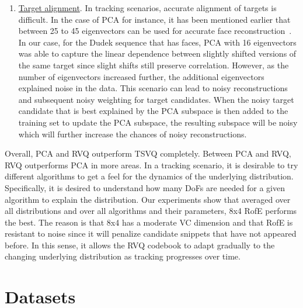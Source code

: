 \begin{enumerate}
\item \underline{Target alignment}.  In tracking scenarios, accurate alignment of targets is difficult.  In the case of PCA for instance, it has been mentioned earlier that between 25 to 45 eigenvectors can be used for accurate face reconstruction~\cite{1997_JNL_EigenVsFisherFaces_Bel}.  In our case, for the Dudek sequence that has faces, PCA with 16 eigenvectors was able to capture the linear dependence between slightly shifted versions of the same target since slight shifts still preserve correlation.  However, as the number of eigenvectors increased further, the additional eigenvectors explained noise in the data.  This scenario can lead to noisy reconstructions and subsequent noisy weighting for target candidates.  When the noisy target candidate that is best explained by the PCA subspace is then added to the training set to update the PCA subspace, the resulting subspace will be noisy which will further increase the chances of noisy reconstructions.  
\end{enumerate}

Overall, PCA and RVQ outperform TSVQ completely.  Between PCA and RVQ, RVQ outperforms PCA in more areas.  In a tracking scenario, it is desirable to try different algorithms to get a feel for the dynamics of the underlying distribution.  Specifically, it is desired to understand how many DoFs are needed for a given algorithm to explain the distribution.  Our experiments show that averaged over all distributions and over all algorithms and their parameters, 8x4 RofE performs the best.  The reason is that 8x4 has a moderate VC dimension and that RofE is resistant to noise since it will penalize candidate snippets that have not appeared before.  In this sense, it allows the RVQ codebook to adapt gradually to the changing underlying distribution as tracking progresses over time.


%



\appendix
\clearpage
\newpage
\section{Datasets}
\label{App:dataset_snapshots}

